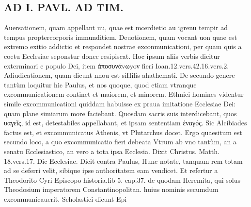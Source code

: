 \documentclass{article}
\begin{document}
\begin{pages}
\section*{AD I. PAVL. AD TIM. }
\marginpar{[ p.392 ]} Auersationem, quam appellant uu, quae est mcerdietio au igrenu tempir ad tempus proptercorporis immunditiem.  \pend{} Deuotionem, quam vocant uon quae est extremo exitio addictio et respondet nostrae exconmunicationi, per quam quis a coetu Ecclesiae seponstur donec resipiscat. Hoc ipsum aliis verbis dicitur exterminari e populo Dei, item ἀποσυνάvωyoν fieri Ioan.12.vers.42.16.vers.2.  \pend\pstart Adiudicationem, quam dicunt nnou est siHilis ahathemati.  \pend\pstart De secundo genere tantùm loquitur hic Paulus, et nos quoque, quod etiam vtranque excommunicationem continet et maiorem, et minorem.  \pend\pstart Ethnici homines videntur simile excommunicationi quiddam habuisse ex praua imitatione Ecclesiae Dei: quam plane simiarum more faciebant. Quosdam sacris suis interdicebant, quos υαγεῖς, id est, detestabiles appellabant, et ipsam sententiam ἐναγός. Sic Alcibiades factus est, et excommunicatus Athenis, vt Plutarchus docet.  \pend\pstart Ergo quaesitum est secundo loco, a quo excommunicatio fieri debeata Vtrum ab vno tantùm, an a senatu Ecclesiastico, an vero a tota ipsa Ecclesia. Dixit Christus. Matth. 18.vers.17. Dic Ecclesiae. Dicit contra Paulus, Hunc notate, tanquam rem totam ad se deferri velit, sibique ipse authoritatem eam vendicet. Et refertur a Theodorito Cyri Episcopo historia.lib 5. cap.37. de quodam Heremita, qui solus Theodosium imperatorem Constantinopolitan. huius nominis secumdum excommunicauerit. Scholastici dicunt Epi\pend

\end{pages}
\end{document}
